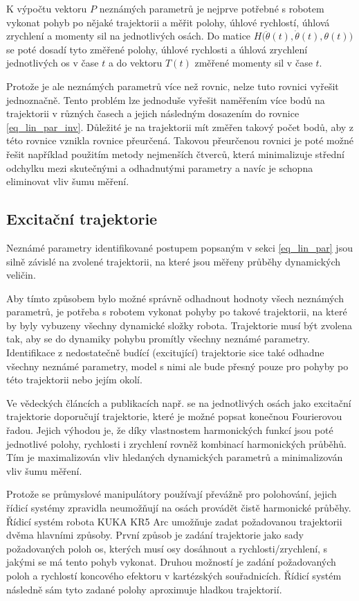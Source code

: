 K výpočtu vektoru $P$ neznámých parametrů je nejprve potřebné s robotem vykonat pohyb po nějaké trajektorii a měřit polohy, úhlové rychlostí, úhlová zrychlení a momenty sil na jednotlivých osách. Do matice $H\big(\ddot{\theta}(t),\dot{\theta}(t),\theta(t)\big)$ se poté dosadí tyto změřené polohy, úhlové rychlosti a úhlová zrychlení jednotlivých os v čase $t$ a do vektoru $T(t)$ změřené momenty sil v čase $t$. 

Protože je ale neznámých parametrů více než rovnic, nelze tuto rovnici vyřešit jednoznačně. Tento problém lze jednoduše vyřešit naměřením více bodů na trajektorii v různých časech a jejich následným dosazením do rovnice \ref{eq_lin_par_inv}. Důležité je na trajektorii mít změřen takový počet bodů, aby z této rovnice vznikla rovnice přeurčená. Takovou přeurčenou rovnici je poté možné řešit například použitím metody nejmenších čtverců, která minimalizuje střední odchylku mezi skutečnými a odhadnutými parametry a navíc je schopna eliminovat vliv šumu měření. 

\subsection{Excitační trajektorie}

Neznámé parametry identifikované postupem popsaným v sekci \ref{eq_lin_par} jsou silně závislé na zvolené trajektorii, na které jsou měřeny průběhy dynamických veličin. 

Aby tímto způsobem bylo možné správně odhadnout hodnoty všech neznámých parametrů, je potřeba s robotem vykonat pohyby po takové trajektorii, na které by byly vybuzeny všechny dynamické složky robota. Trajektorie musí být zvolena tak, aby se do dynamiky pohybu promítly všechny neznámé parametry. Identifikace z nedostatečně budící (excitující) trajektorie sice také odhadne všechny neznámé parametry, model s nimi ale bude přesný pouze pro pohyby po této trajektorii nebo jejím okolí.

Ve vědeckých článcích a publikacích např. \cite{dyn_mod_ind}\cite{dyn_ind_mits}\cite{clos_dyn_par} se na jednotlivých osách jako excitační trajektorie doporučují trajektorie, které je možné popsat konečnou Fourierovou řadou. Jejich výhodou je, že díky vlastnostem harmonických funkcí jsou poté jednotlivé polohy, rychlosti i zrychlení rovněž kombinací harmonických průběhů. Tím je maximalizován vliv hledaných dynamických parametrů a minimalizován vliv šumu měření. 

Protože se průmyslové manipulátory používají převážně pro polohování, jejich řídicí systémy zpravidla neumožňují na osách provádět čistě harmonické průběhy. Řídicí systém robota KUKA KR5 Arc umožňuje zadat požadovanou trajektorii dvěma hlavními způsoby. První způsob je zadání trajektorie jako sady požadovaných poloh os, kterých musí osy dosáhnout a rychlosti/zrychlení, s jakými se má tento pohyb vykonat. Druhou možností je zadání požadovaných poloh a rychlostí koncového efektoru v kartézských souřadnicích. Řídicí systém následně sám tyto zadané polohy aproximuje hladkou trajektorií. 

